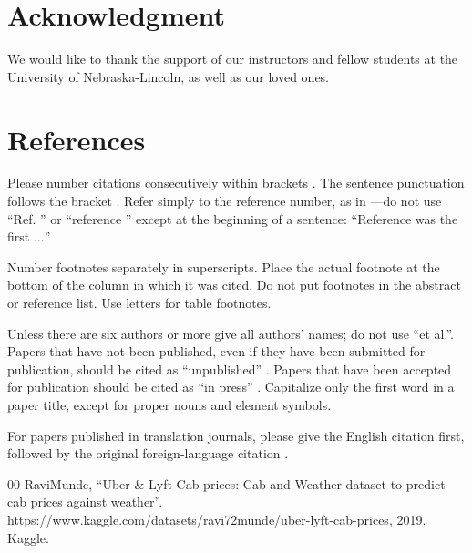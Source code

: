 \documentclass[conference]{IEEEtran}
\begin{document}
\section*{Acknowledgment}

We would like to thank the support of our instructors and fellow students at the University of Nebraska-Lincoln, as well as our loved ones.

\section*{References}

Please number citations consecutively within brackets \cite{b1}. The 
sentence punctuation follows the bracket \cite{b2}. Refer simply to the reference 
number, as in \cite{b3}---do not use ``Ref. \cite{b3}'' or ``reference \cite{b3}'' except at 
the beginning of a sentence: ``Reference \cite{b3} was the first $\ldots$''

Number footnotes separately in superscripts. Place the actual footnote at 
the bottom of the column in which it was cited. Do not put footnotes in the 
abstract or reference list. Use letters for table footnotes.

Unless there are six authors or more give all authors' names; do not use 
``et al.''. Papers that have not been published, even if they have been 
submitted for publication, should be cited as ``unpublished'' \cite{b4}. Papers 
that have been accepted for publication should be cited as ``in press'' \cite{b5}. 
Capitalize only the first word in a paper title, except for proper nouns and 
element symbols.

For papers published in translation journals, please give the English 
citation first, followed by the original foreign-language citation \cite{b6}.

\begin{thebibliography}{00}
 RaviMunde, ``Uber \& Lyft Cab prices:
Cab and Weather dataset to predict cab prices against weather''. https://www.kaggle.com/datasets/ravi72munde/uber-lyft-cab-prices, 2019. Kaggle.
\end{thebibliography}
\end{document}
